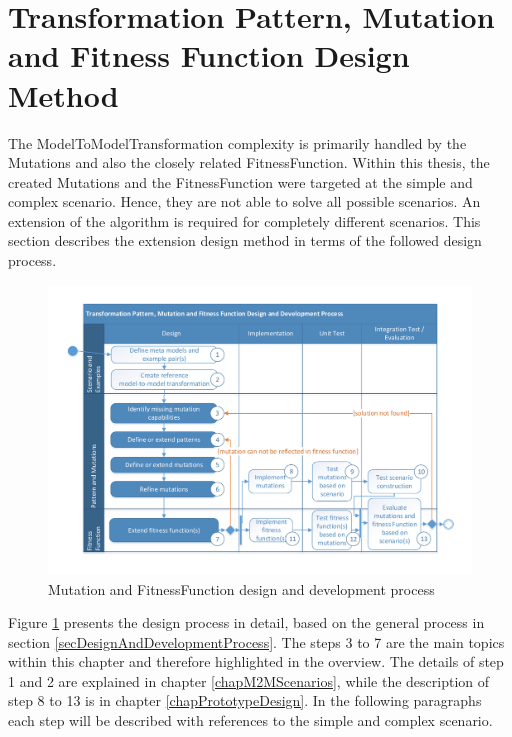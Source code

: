 \newpage
\section{Transformation Pattern, Mutation and Fitness Function Design Method}
\label{secMutationAndFitnessFunctionDesignProcess}

The \gls{ModelToModelTransformation} complexity is primarily handled by the \glspl{Mutation} and also the closely related \gls{FitnessFunction}. Within this thesis, the created \glspl{Mutation} and the \gls{FitnessFunction} were targeted at the simple and complex scenario. Hence, they are not able to solve all possible scenarios. An extension of the algorithm is required for completely different scenarios. This section describes the extension design method in terms of the followed design process.

\begin{figure}[!ht]
	\centering
	\includegraphics[scale=0.6, trim=0cm 1cm 0cm 1cm, clip=true]{Images/MutationAndFitnessFunctionDevelpomentProcess.pdf} 
	\caption{\Gls{Mutation} and \gls{FitnessFunction} design and development process}
	\label{figMutationAndFitnessFunctionDevelpomentProcess}
\end{figure}

Figure \ref{figMutationAndFitnessFunctionDevelpomentProcess} presents the design process in detail, based on the general process in section \ref{secDesignAndDevelopmentProcess}. The steps 3 to 7 are the main topics within this chapter and therefore highlighted in the overview. The details of step 1 and 2 are explained in chapter \ref{chapM2MScenarios}, while the description of step 8 to 13 is in chapter \ref{chapPrototypeDesign}. In the following paragraphs each step will be described with references to the simple and complex scenario.

